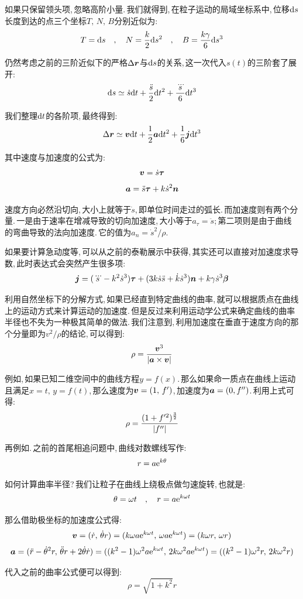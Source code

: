 如果只保留领头项,\,忽略高阶小量.\,我们就得到,\,在粒子运动的局域坐标系中,\,位移$\textrm{d} s$长度到达的点三个坐标$T,\,N,\,B$分别近似为:
\[T=\textrm{d} s \quad,\quad N=\frac{k}{2}\textrm{d} s^2 \quad,\quad B=\frac{k\gamma}{6}\textrm{d} s^3\]

仍然考虑之前的三阶近似下的严格$\Delta \boldsymbol{r}$与$\textrm{d}{s}$的关系,\,这一次代入$s(t)$的三阶套了展开:
\[\textrm{d} s\simeq \dot{s}\textrm{d} t+\frac{\ddot{s}}{2}\textrm{d} t^2+\frac{\dddot{s}}{6}\textrm{d} t^3\]

我们整理$\textrm{d} t$的各阶项,\,最终得到:
\[\Delta \boldsymbol{r}\simeq \boldsymbol{v}\textrm{d} t+\frac{1}{2}\boldsymbol{a}\textrm{d} t^2+\frac{1}{6}\boldsymbol{j}\textrm{d} t^3\]

其中速度与加速度的公式为:
\[\boldsymbol{v}=\dot{s}\boldsymbol{\tau}\]
\[\boldsymbol{a}=\ddot{s}\boldsymbol{\tau}+k\dot{s}^2\boldsymbol{n}\]

速度方向必然沿切向,\,大小上就等于$\dot{s}$,\,即单位时间走过的弧长.\,而加速度则有两个分量.\,一是由于速率在增减导致的切向加速度,\,大小等于$a_\tau=\ddot{s}$;\,第二项则是由于曲线的弯曲导致的法向加速度.\,它的值为$a_n=\dot{s}^2/\rho$.\,

如果要计算急动度等,\,可以从之前的泰勒展示中获得,\,其实还可以直接对加速度求导数,\,此时表达式会突然产生很多项:
\[\boldsymbol{j}=(\dddot{s}-k^2\dot{s}^3)\boldsymbol{\tau}+(3k\dot{s}\ddot{s}+\dot{k}\dot{s}^3)\boldsymbol{n}+k\gamma\dot{s}^3\boldsymbol{\beta}\]

利用自然坐标下的分解方式,\,如果已经直到特定曲线的曲率,\,就可以根据质点在曲线上的运动方式来计算运动的加速度.\,但是反过来利用运动学公式来确定曲线的曲率半径也不失为一种极其简单的做法.\,我们注意到,\,利用加速度在垂直于速度方向的那个分量即为$v^2/\rho$的结论,\,可以得到:
\[\rho=\frac{\boldsymbol{v}^3}{\left| \boldsymbol{a}\times\boldsymbol{v} \right|}\]

例如,\,如果已知二维空间中的曲线方程$y=f(x)$.\,那么如果命一质点在曲线上运动且满足$x=t,\,y=f(t)$,\,那么速度为$\boldsymbol{v}=(1,\,f')$,\,加速度为$\boldsymbol{a}=(0,f'')$.\,利用上式可得:
\[\rho=\frac{(1+f'^2)^\frac{3}{2}}{\left| f'' \right|}\]

再例如.\,之前的首尾相追问题中,\,曲线对数螺线写作:
\[r=a{\rm e}^{k\theta}\]

如何计算曲率半径?\,我们让粒子在曲线上绕极点做匀速旋转,\,也就是:
\[\theta=\omega t\quad,\quad r=a{\rm e}^{k\omega t}\]

那么借助极坐标的加速度公式得:
\[\boldsymbol{v}=(\dot{r},\,\dot{\theta}r)=(k\omega a{\rm e}^{k\omega t},\,\omega a{\rm e}^{k\omega t})=(k\omega r,\,\omega r)\]
\[\boldsymbol{a}=(\ddot{r}-\dot{\theta}^2r,\,\ddot{\theta}r+2\dot{\theta}\dot{r})=((k^2-1)\omega^2 a{\rm e}^{k\omega t},\,2k\omega^2 a{\rm e}^{k\omega t})=((k^2-1)\omega^2 r,\,2k\omega^2 r)\]

代入之前的曲率公式便可以得到:
\[\rho=\sqrt{1+k^2}r\]

